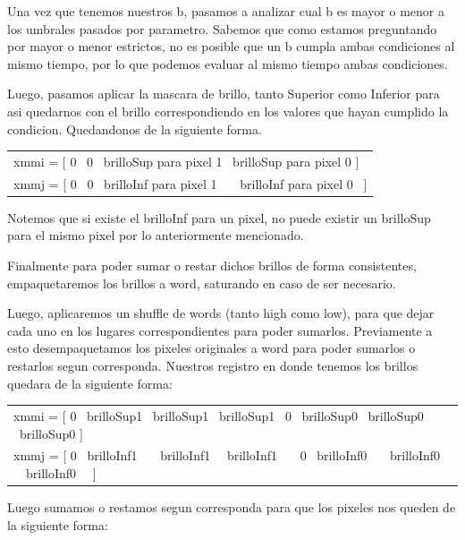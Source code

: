 \documentclass[a4paper]{article}
\begin{document}
Una vez que tenemos nuestros b, pasamos a analizar cual b es mayor o menor a los umbrales pasados por parametro. Sabemos que como estamos preguntando por mayor o menor estrictos, no es posible que un b cumpla ambas condiciones al mismo tiempo, por lo que podemos evaluar al mismo tiempo ambas condiciones.

Luego, pasamos aplicar la mascara de brillo, tanto Superior como Inferior para asi quedarnos con el brillo correspondiendo en los valores que hayan cumplido la condicion. Quedandonos de la siguiente forma.

\begin{center}
	\begin{tabular}{l}
		xmmi = [ 0 \textpipe\ 0 \textpipe\ brilloSup para pixel 1 \textpipe\ brilloSup para pixel 0 ]\\
		xmmj = [ 0 \textpipe\ 0 \textpipe\ brilloInf para pixel 1 \ \ \textpipe\ brilloInf para pixel 0 \ ]
	\end{tabular}
	
\end{center}

Notemos que si existe el brilloInf para un pixel, no puede existir un brilloSup para el mismo pixel por lo anteriormente mencionado.

Finalmente para poder sumar o restar dichos brillos de forma consistentes, empaquetaremos los brillos a word, saturando en caso de ser necesario.

Luego, aplicaremos un shuffle de words (tanto high como low), para que dejar cada uno en los lugares correspondientes para poder sumarlos. Previamente a esto desempaquetamos los pixeles originales a word para poder sumarlos o restarlos segun corresponda. Nuestros registro en donde tenemos los brillos quedara de la siguiente forma:

\begin{center}
	\begin{tabular}{l}
		xmmi = [ 0 \textpipe\ brilloSup1 \textpipe\ brilloSup1 \textpipe\ brilloSup1 \textpipe\ 0 \textpipe\ brilloSup0 \textpipe\ brilloSup0 \textpipe\ brilloSup0 ] \\
		xmmj = [ 0 \textpipe\ brilloInf1 \ \  \textpipe\ brilloInf1 \ \textpipe\ brilloInf1 \ \ \textpipe\ 0 \textpipe\ brilloInf0 \ \ \textpipe\ brilloInf0 \ \textpipe\ brilloInf0 \ \ ]
	\end{tabular}
\end{center}


Luego sumamos o restamos segun corresponda para que los pixeles nos queden de la siguiente forma:
\end{document}
